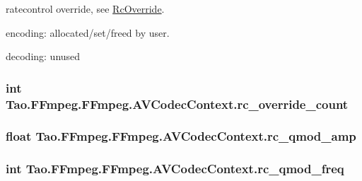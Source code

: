 \label{struct_tao_1_1_f_fmpeg_1_1_f_fmpeg_1_1_a_v_codec_context_a3c76f1e9458cdafec9cf159f51453cf7}
ratecontrol override, see \hyperlink{struct_tao_1_1_f_fmpeg_1_1_f_fmpeg_1_1_rc_override}{RcOverride}.
\begin{DoxyItemize}
\item encoding: allocated/set/freed by user.
\item decoding: unused 
\end{DoxyItemize}\hypertarget{struct_tao_1_1_f_fmpeg_1_1_f_fmpeg_1_1_a_v_codec_context_a22140a41f483ef0f552f872fb9ee644c}{
\subsubsection[{rc\_\-override\_\-count}]{\setlength{\rightskip}{0pt plus 5cm}int {\bf Tao.FFmpeg.FFmpeg.AVCodecContext.rc\_\-override\_\-count}}}
\label{struct_tao_1_1_f_fmpeg_1_1_f_fmpeg_1_1_a_v_codec_context_a22140a41f483ef0f552f872fb9ee644c}
\hypertarget{struct_tao_1_1_f_fmpeg_1_1_f_fmpeg_1_1_a_v_codec_context_acbf98a0cc442069d2f45ec704eacd08f}{
\subsubsection[{rc\_\-qmod\_\-amp}]{\setlength{\rightskip}{0pt plus 5cm}float {\bf Tao.FFmpeg.FFmpeg.AVCodecContext.rc\_\-qmod\_\-amp}}}
\label{struct_tao_1_1_f_fmpeg_1_1_f_fmpeg_1_1_a_v_codec_context_acbf98a0cc442069d2f45ec704eacd08f}
\hypertarget{struct_tao_1_1_f_fmpeg_1_1_f_fmpeg_1_1_a_v_codec_context_a11e80e40d61d202378b6140df53598f8}{
\subsubsection[{rc\_\-qmod\_\-freq}]{\setlength{\rightskip}{0pt plus 5cm}int {\bf Tao.FFmpeg.FFmpeg.AVCodecContext.rc\_\-qmod\_\-freq}}}
